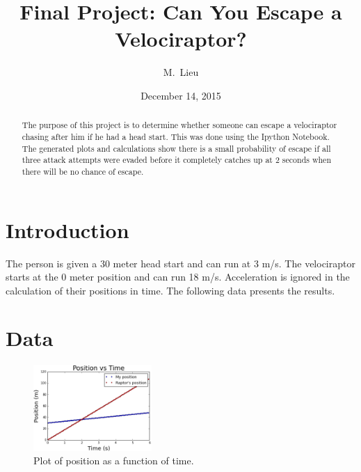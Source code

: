 \documentclass[twocolumn]{revtex4}
\begin{document}
\title{
Final Project: Can You Escape a Velociraptor?
}

\author{M.~Lieu}


\date{December 14, 2015}

\begin{abstract}
    The purpose of this project is to determine whether someone can escape a velociraptor chasing after him if he had a head start. This was done using the Ipython Notebook. The generated plots and calculations show there is a small probability of escape if all three attack attempts were evaded before it completely catches up at 2 seconds when there will be no chance of escape.
\end{abstract}

\maketitle

\section{Introduction}
	The person is given a 30 meter head start and can run at 3 m/s. The velociraptor starts at the 0 meter position and can run 18 m/s. Acceleration is ignored in the calculation of their positions in time. The following data presents the results.

\section{Data}
\begin{figure} [!h]            		
\includegraphics[width=0.40\textwidth]{positionplot.png}        
\caption{Plot of position as a function of time.}
\label{position}

\end{figure}
\end{document}
